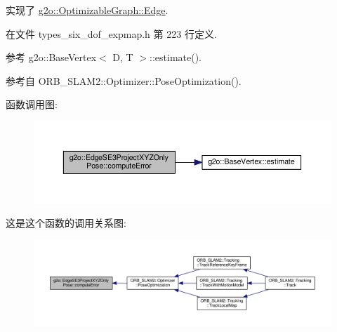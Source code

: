 实现了 \hyperlink{classg2o_1_1OptimizableGraph_1_1Edge}{g2o\-::\-Optimizable\-Graph\-::\-Edge}.



在文件 types\-\_\-six\-\_\-dof\-\_\-expmap.\-h 第 223 行定义.



参考 g2o\-::\-Base\-Vertex$<$ D, T $>$\-::estimate().



参考自 O\-R\-B\-\_\-\-S\-L\-A\-M2\-::\-Optimizer\-::\-Pose\-Optimization().



函数调用图\-:
\nopagebreak
\begin{figure}[H]
\begin{center}
\leavevmode
\includegraphics[width=350pt]{classg2o_1_1EdgeSE3ProjectXYZOnlyPose_a6752098d3322d30e43a6a3a668a3b009_cgraph}
\end{center}
\end{figure}




这是这个函数的调用关系图\-:
\nopagebreak
\begin{figure}[H]
\begin{center}
\leavevmode
\includegraphics[width=350pt]{classg2o_1_1EdgeSE3ProjectXYZOnlyPose_a6752098d3322d30e43a6a3a668a3b009_icgraph}
\end{center}
\end{figure}


